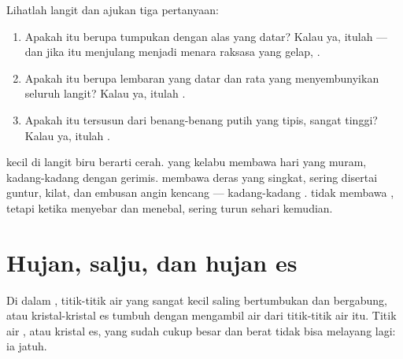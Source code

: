 \begin{method}\label{met:g4:clouds-rain-snow:naming}
Lihatlah langit dan ajukan tiga pertanyaan:
\begin{enumerate}
  \item Apakah  itu berupa tumpukan dengan alas yang datar? Kalau ya,
        itulah  --- dan jika  itu menjulang menjadi menara raksasa
        yang gelap, .
  \item Apakah  itu berupa lembaran yang datar dan rata yang
        menyembunyikan seluruh langit? Kalau ya, itulah .
  \item Apakah  itu tersusun dari benang-benang putih yang tipis, sangat
        tinggi? Kalau ya, itulah .
\end{enumerate}
\end{method}

\begin{remark}\label{rem:g4:clouds-rain-snow:tell}
 kecil di langit biru berarti  cerah.  yang kelabu
membawa hari yang muram, kadang-kadang dengan gerimis.  membawa
 deras yang singkat, sering disertai guntur, kilat, dan embusan angin
kencang --- kadang-kadang .  tidak membawa , tetapi
ketika  menyebar dan menebal,  sering turun sehari kemudian.
\end{remark}

\section{Hujan, salju, dan hujan es}

Di dalam , titik-titik air yang sangat kecil saling bertumbukan dan
bergabung, atau kristal-kristal es tumbuh dengan mengambil air dari
titik-titik air itu. Titik air , atau kristal es, yang sudah cukup
besar dan berat tidak bisa melayang lagi: ia jatuh.

